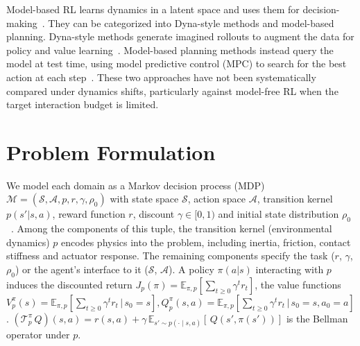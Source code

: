 \documentclass{article} %
\begin{document}
Model-based RL learns dynamics in a latent space and uses them for decision-making~\citep{atkeson1997comparison, oh2017value, ha2018recurrent, hafner2019learning, zhang2019solar, hafner2020mastering, hafner2023mastering, hansen2022temporal, hansen2024td, fujimoto2025towards}. They can be categorized into Dyna-style methods and model-based planning. Dyna-style methods generate imagined rollouts to augment the data for policy and value learning~\citep{sutton1991dyna, janner2019trust, feinberg2018model, buckman2018sample}. Model-based planning methods instead query the model at test time, using model predictive control (MPC) to search for the best action at each step~\citep{williams2015model, nagabandi2018neural, ebert2018visual, chua2018deep, lowrey2018plan, wang2019exploring, chang2026surprising}.
These two approaches have not been systematically compared under dynamics shifts, particularly against model-free RL when the target interaction budget is limited.



\section{Problem Formulation}
\label{sec:preliminary}

We model each domain as a Markov decision process (MDP) $\mathcal{M} = (\mathcal{S}, \mathcal{A}, p, r, \gamma, \rho_0)$ with state space $\mathcal{S}$, action space $\mathcal{A}$, transition kernel $p(s' | s, a)$, reward function $r$, discount $\gamma \in [0,1)$ and initial state distribution $\rho_0$~\citep{sutton1998reinforcement}. Among the components of this tuple, the transition kernel (environmental dynamics) $p$ encodes physics into the problem, including inertia, friction, contact stiffness and actuator response. The remaining components specify the task ($r$, $\gamma$, $\rho_0$) or the agent's interface to it ($\mathcal{S}$, $\mathcal{A}$). A policy $\pi(a | s)$ interacting with $p$ induces the discounted return $J_{p}(\pi) = \mathbb{E}_{\pi,p}[\sum_{t\ge0} \gamma^t r_t]$, the value functions $V^{\pi}_{p}(s) = \mathbb{E}_{\pi,p}[\sum_{t\ge0} \gamma^{t} r_t \,|\, s_0 = s], Q^{\pi}_{p}(s,a) = \mathbb{E}_{\pi,p}[\sum_{t\ge0} \gamma^{t} r_t \,|\, s_0 = s, a_0 = a]$. $\left(\mathcal{T}^\pi_{p}\,Q\right)(s,a) = r(s,a) + \gamma\,
\mathbb{E}_{s' \sim p(\cdot \mid s,a)}\!\left[\,Q\!\left(s',
\pi(s')\right)\right]$ is the Bellman operator under $p$.
\end{document}
